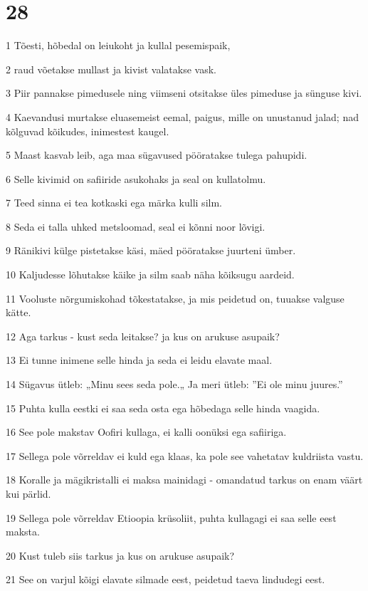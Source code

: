 \chapter{28}

\par 1 Tõesti, hõbedal on leiukoht ja kullal pesemispaik,
\par 2 raud võetakse mullast ja kivist valatakse vask.
\par 3 Piir pannakse pimedusele ning viimseni otsitakse üles pimeduse ja sünguse kivi.
\par 4 Kaevandusi murtakse eluasemeist eemal, paigus, mille on unustanud jalad; nad kõlguvad kõikudes, inimestest kaugel.
\par 5 Maast kasvab leib, aga maa sügavused pööratakse tulega pahupidi.
\par 6 Selle kivimid on safiiride asukohaks ja seal on kullatolmu.
\par 7 Teed sinna ei tea kotkaski ega märka kulli silm.
\par 8 Seda ei talla uhked metsloomad, seal ei kõnni noor lõvigi.
\par 9 Ränikivi külge pistetakse käsi, mäed pööratakse juurteni ümber.
\par 10 Kaljudesse lõhutakse käike ja silm saab näha kõiksugu aardeid.
\par 11 Vooluste nõrgumiskohad tõkestatakse, ja mis peidetud on, tuuakse valguse kätte.
\par 12 Aga tarkus - kust seda leitakse? ja kus on arukuse asupaik?
\par 13 Ei tunne inimene selle hinda ja seda ei leidu elavate maal.
\par 14 Sügavus ütleb: „Minu sees seda pole.„ Ja meri ütleb: ”Ei ole minu juures.”
\par 15 Puhta kulla eestki ei saa seda osta ega hõbedaga selle hinda vaagida.
\par 16 See pole makstav Oofiri kullaga, ei kalli oonüksi ega safiiriga.
\par 17 Sellega pole võrreldav ei kuld ega klaas, ka pole see vahetatav kuldriista vastu.
\par 18 Koralle ja mägikristalli ei maksa mainidagi - omandatud tarkus on enam väärt kui pärlid.
\par 19 Sellega pole võrreldav Etioopia krüsoliit, puhta kullagagi ei saa selle eest maksta.
\par 20 Kust tuleb siis tarkus ja kus on arukuse asupaik?
\par 21 See on varjul kõigi elavate silmade eest, peidetud taeva lindudegi eest.
